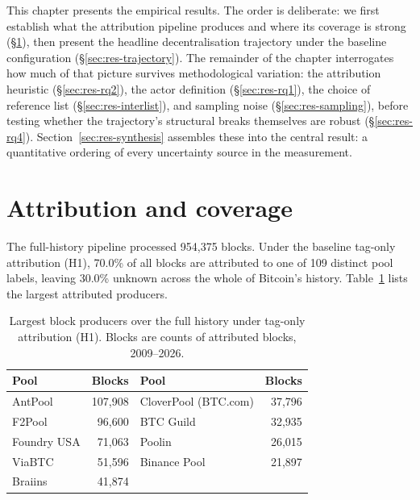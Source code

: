 \documentclass[logo,msc]{infthesis}           %
\begin{document}
This chapter presents the empirical results. The order is deliberate: we first
establish what the attribution pipeline produces and where its coverage is strong
(\S\ref{sec:res-coverage}), then present the headline decentralisation trajectory
under the baseline configuration (\S\ref{sec:res-trajectory}). The remainder of the
chapter interrogates how much of that picture survives methodological variation:
the attribution heuristic (\S\ref{sec:res-rq2}), the actor definition
(\S\ref{sec:res-rq1}), the choice of reference list (\S\ref{sec:res-interlist}),
and sampling noise (\S\ref{sec:res-sampling}), before testing whether the
trajectory's structural breaks themselves are robust (\S\ref{sec:res-rq4}).
Section~\ref{sec:res-synthesis} assembles these into the central result: a
quantitative ordering of every uncertainty source in the measurement.
 
\section{Attribution and coverage}
\label{sec:res-coverage}
 
The full-history pipeline processed 954{,}375 blocks. Under the baseline tag-only
attribution (H1), 70.0\% of all blocks are attributed to one of 109 distinct pool
labels, leaving 30.0\% unknown across the whole of Bitcoin's history.
Table~\ref{tab:toppools} lists the largest attributed producers.
 
\begin{table}[t]
  \centering
  \caption{Largest block producers over the full history under tag-only
  attribution (H1). Blocks are counts of attributed blocks, 2009--2026.}
  \label{tab:toppools}
  \begin{tabular}{lr@{\qquad}lr}
    \toprule
    Pool & Blocks & Pool & Blocks \\
    \midrule
    AntPool     & 107{,}908 & CloverPool (BTC.com) & 37{,}796 \\
    F2Pool      &  96{,}600 & BTC Guild            & 32{,}935 \\
    Foundry USA &  71{,}063 & Poolin               & 26{,}015 \\
    ViaBTC      &  51{,}596 & Binance Pool         & 21{,}897 \\
    Braiins     &  41{,}874 & \\
    \bottomrule
  \end{tabular}
\end{table}
 
\end{document}
